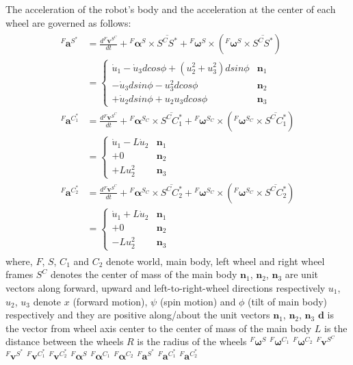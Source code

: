 \documentclass[a4paper,10pt]{article}
\begin{document}
The acceleration of the robot's body and the acceleration at the center of each wheel are governed as follows:
\begin{align} \label{eq:kinem5} \begin{split}
 {}^F\mathbf{a}^{S^*} &= \frac{d{}^F\mathbf{v}^{S^C}}{dt}+{}^F\mathbf{\alpha}^S\times \overline{S^CS^*}+{}^F\mathbf{\omega}^S\times \left({}^F\mathbf{\omega}^S\times \overline{S^CS^*}\right) \\
 &=\begin{cases}
    \dot{u}_1-\dot{u}_3dcos\phi+\left(u_2^2+u_3^2\right)dsin\phi &\mathbf{n}_1 \\
    -\dot{u}_3dsin\phi-u_3^2dcos\phi &\mathbf{n}_2 \\
    +\dot{u}_2dsin\phi+u_2u_3dcos\phi &\mathbf{n}_3 
   \end{cases} \\
 {}^F\mathbf{a}^{C_1^*} &= \frac{d{}^F\mathbf{v}^{S^C}}{dt}+{}^F\mathbf{\alpha}^{S_C}\times \overline{S^CC_1^*}+{}^F\mathbf{\omega}^{S_C}\times \left({}^F\mathbf{\omega}^{S_C}\times \overline{S^CC_1^*}\right) \\
 &=\begin{cases}
    \dot{u}_1-L\dot{u}_2 &\mathbf{n}_1 \\
    +0 &\mathbf{n}_2 \\
    +Lu_2^2 &\mathbf{n}_3 
   \end{cases} \\
 {}^F\mathbf{a}^{C_2^*} &= \frac{d{}^F\mathbf{v}^{S^C}}{dt}+{}^F\mathbf{\alpha}^{S_C}\times \overline{S^CC_2^*}+{}^F\mathbf{\omega}^{S_C}\times \left({}^F\mathbf{\omega}^{S_C}\times \overline{S^CC_2^*}\right) \\
 &=\begin{cases}
    \dot{u}_1+L\dot{u}_2 &\mathbf{n}_1 \\
    +0 &\mathbf{n}_2 \\
    -Lu_2^2 &\mathbf{n}_3 
   \end{cases} 
\end{split} \end{align} where,
$F$, $S$, $C_1$ and $C_2$ denote world, main body, left wheel and right wheel frames
$S^C$ denotes the center of mass of the main body
$\mathbf{n}_1$, $\mathbf{n}_2$, $\mathbf{n}_3$ are unit vectors along forward, upward and left-to-right-wheel directions respectively
$u_1$, $u_2$, $u_3$ denote $x$ (forward motion), $\psi$ (spin motion) and $\phi$ (tilt of main body) 
respectively and they are positive along/about the unit vectors $\mathbf{n}_1$, $\mathbf{n}_2$, $\mathbf{n}_3$
$\mathbf{d}$ is the vector from wheel axis center to the center of mass of the main body
$L$ is the distance between the wheels
$R$ is the radius of the wheels
${}^F\mathbf{\omega}^S$
${}^F\mathbf{\omega}^{C_1}$
${}^F\mathbf{\omega}^{C_2}$
${}^F\mathbf{v}^{S^C}$
${}^F\mathbf{v}^{S^*}$
${}^F\mathbf{v}^{C_1^*}$
${}^F\mathbf{v}^{C_2^*}$
${}^F\mathbf{\alpha}^S$
${}^F\mathbf{\alpha}^{C_1}$
${}^F\mathbf{\alpha}^{C_2}$
${}^F\mathbf{a}^{S^*}$
${}^F\mathbf{a}^{C_1^*}$
${}^F\mathbf{a}^{C_2^*}$



\end{document}
